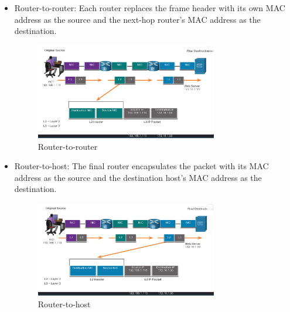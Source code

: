 \documentclass[a4paper,11pt]{article}
\begin{document}
\begin{enumerate}
\begin{itemize}
\begin{itemize}
            
            \item Router-to-router: Each router replaces the frame header with its own MAC address as the source and the next-hop router's MAC address as the destination.\\

\begin{figure}[h!]
\centering
\includegraphics[width=0.75\textwidth]{35.png}
\caption{Router-to-router}
\label{fig:cap1}
\end{figure}

            
            \item Router-to-host: The final router encapsulates the packet with its MAC address as the source and the destination host's MAC address as the destination.\\

\begin{figure}[h!]
\centering
\includegraphics[width=0.75\textwidth]{36.png}
\caption{Router-to-host}
\label{fig:cap1}
\end{figure}


\end{itemize}
\end{itemize}
\end{enumerate}
\end{document}
